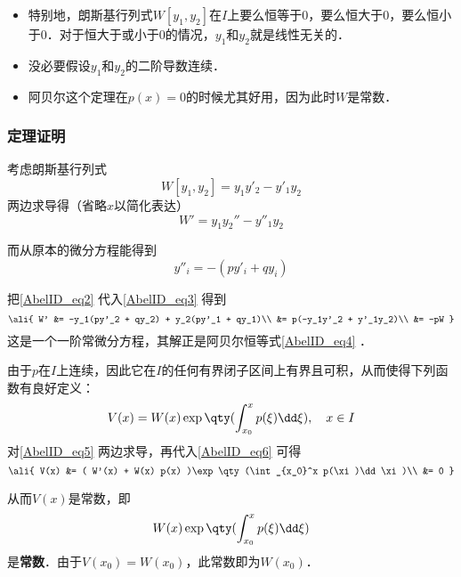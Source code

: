 \begin{itemize}
\item 特别地，朗斯基行列式$W[y_1, y_2]$在$I$上要么恒等于$0$，要么恒大于$0$，要么恒小于$0$．对于恒大于或小于$0$的情况，$y_1$和$y_2$就是线性无关的．
\item 没必要假设$y_1$和$y_2$的二阶导数连续．
\item 阿贝尔这个定理在$p(x)=0$的时候尤其好用，因为此时$W$是常数．
\end{itemize}


\subsubsection{定理证明}

考虑朗斯基行列式
\begin{equation}
W[y_1, y_2] = y_1y'_2 - y'_1y_2
\end{equation}
两边求导得（省略$x$以简化表达）
\begin{equation}\label{AbelID_eq3}
W' = y_1y_2'' - y''_1y_2
\end{equation}

而从原本的微分方程能得到
\begin{equation}\label{AbelID_eq2}
y''_i = -(py'_i+qy_i)
\end{equation}

把\autoref{AbelID_eq2} 代入\autoref{AbelID_eq3} 得到
\begin{equation}\label{AbelID_eq6}
\ali{
    W' &= -y_1(py'_2 + qy_2) + y_2(py'_1 + qy_1)\\
    &= p(-y_1y'_2 + y'_1y_2)\\
    &= -pW
}
\end{equation}
这是一个一阶常微分方程，其解正是阿贝尔恒等式\autoref{AbelID_eq4} ．

由于$p$在$I$上连续，因此它在$I$的任何有界闭子区间上有界且可积，从而使得下列函数有良好定义：
\begin{equation}\label{AbelID_eq5}
V(x) = W(x) \exp\qty(\int_{x_0}^x p(\xi)\dd \xi),\quad x\in I
\end{equation}
对\autoref{AbelID_eq5} 两边求导，再代入\autoref{AbelID_eq6} 可得
\begin{equation}
\ali{
    V(x) &= ( W'(x) + W(x) p(x) )\exp\qty(\int_{x_0}^x p(\xi)\dd \xi)\\
    &= 0
}
\end{equation}

从而$V(x)$是常数，即
\begin{equation}
W(x)\exp\qty(\int_{x_0}^x p(\xi)\dd \xi)
\end{equation}
是\textbf{常数}．由于$V(x_0)=W(x_0)$，此常数即为$W(x_0)$．



